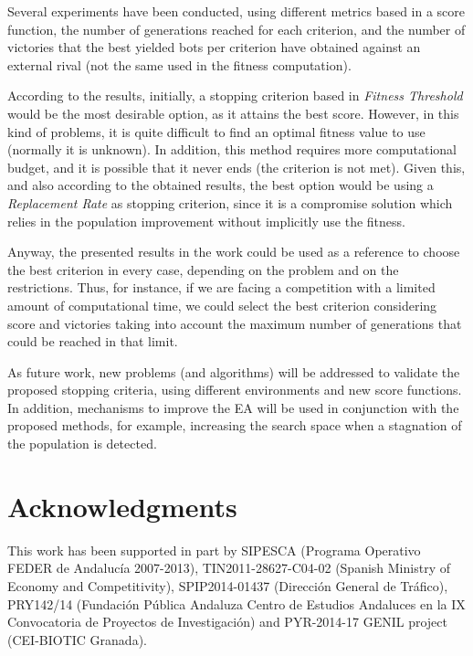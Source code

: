 \documentclass[runningheads,a4paper]{llncs}
\begin{document}
Several experiments have been conducted, using different metrics based in a score function, the number of generations reached for each criterion, and the number of victories that the best yielded bots per criterion have obtained against an external rival (not the same used in the fitness computation).

According to the results, initially, a stopping criterion based in \textit{Fitness Threshold} would be the most desirable option, as it attains the best score. However, in this kind of problems, it is quite difficult to find an optimal fitness value to use (normally it is unknown). In addition, this method requires more computational budget, and it is possible that it never ends (the criterion is not met). Given this, and also according to the obtained results, the best option would be using a \textit{Replacement Rate} as stopping criterion, since it is a compromise solution which relies in the population improvement without implicitly use the fitness.

Anyway, the presented results in the work could be used as a reference to choose the best criterion in every case, depending on the problem and on the restrictions. Thus, for instance, if we are facing a competition with a limited amount of computational time, we could select the best criterion considering score and victories taking into account the maximum number of generations that could be reached in that limit.

As future work, new problems (and algorithms) will be addressed to validate the proposed stopping criteria, using different environments and new score functions. In addition,  mechanisms to improve the EA will be used in conjunction with the proposed methods, for example, increasing the search space when a stagnation of the population is detected.


\section*{Acknowledgments}
\scriptsize{This work has been supported in part by SIPESCA (Programa Operativo FEDER de Andaluc\'ia 2007-2013), TIN2011-28627-C04-02 (Spanish Ministry of Economy and Competitivity), SPIP2014-01437 (Direcci\'on General de Tr\'afico), PRY142/14 (Fundaci\'on P\'ublica Andaluza Centro de Estudios Andaluces en la IX Convocatoria de Proyectos de Investigaci\'on) and PYR-2014-17 GENIL project (CEI-BIOTIC Granada).}


%





\end{document}
